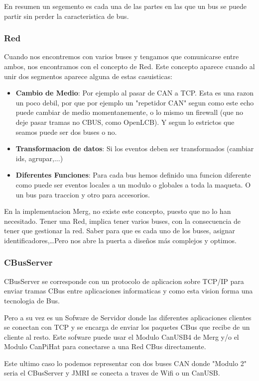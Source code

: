 En resumen un segemento es cada una de las partes en las que un bus se puede partir sin perder la caracteristica de bus.

\subsubsection{Red}
Cuando nos encontremos con varios buses y tengamos que comunicarse entre ambos, nos encontramos con el concepto de Red. Este concepto aparece cuando al unir dos segmentos aparece alguna de estas casuisticas:
\begin{itemize}
	\item \textbf{Cambio de Medio}: Por ejemplo al pasar de CAN a TCP. Esta es una razon un poco debil, por que por ejemplo un "repetidor CAN" segun como este echo puede cambiar de medio momentanemente, o lo mismo un firewall (que no deje pasar tramas no CBUS, como OpenLCB).
Y segun lo estrictos que seamos puede ser dos buses o no.
	\item \textbf{Transformacion de datos}: Si los eventos deben ser transformados (cambiar ids, agrupar,...) 
	\item \textbf{Diferentes Funciones}: Para cada bus hemos definido una funcion diferente como puede ser eventos locales a un modulo o globales a toda la maqueta. O un bus para traccion y otro para accesorios.
\end{itemize}

En la implementacion Merg, no existe este concepto, puesto que no lo han necesitado. Tener una Red, implica tener varios buses, con la consecuencia de tener que gestionar la red. Saber para que es cada uno de los buses, asignar identificadores,\dots Pero nos abre la puerta a diseños más complejos y optimos.

\subsubsection {CBusServer}
CBusServer se corresponde con un protocolo de aplicacion sobre TCP/IP para enviar tramas CBus entre aplicaciones informaticas y como esta vision forma una tecnologia de Bus.

Pero a su vez es un Sofware de Servidor donde las diferentes aplicaciones clientes se conectan con TCP y se encarga de enviar los paquetes CBus que recibe de un cliente al resto. Este sofware puede usar el Modulo CanUSB4 de Merg y/o el Modulo CanPiHat para conectarse a una Red CBus directamente.

Este ultimo caso lo podemos representar con dos buses CAN donde "Modulo 2" seria el CBusServer y
JMRI se conecta a traves de Wifi o un CanUSB.

